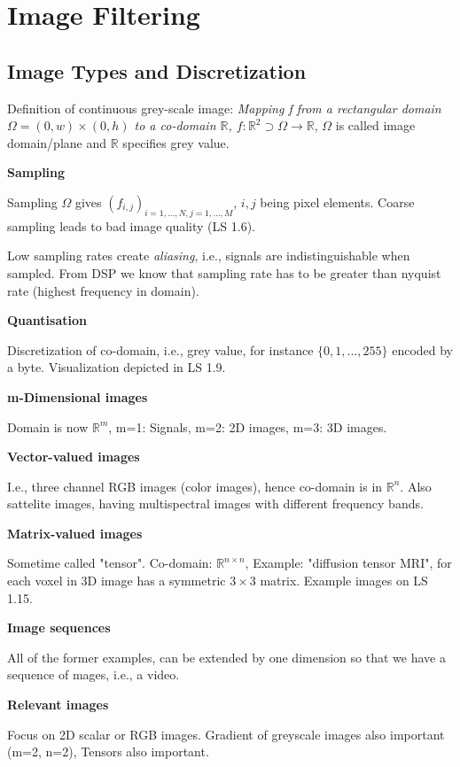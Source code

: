 \chapter{Image Filtering}

\section{Image Types and Discretization}

Definition of continuous grey-scale image: \emph{Mapping f from a rectangular domain $\Omega = (0,w) \times (0,h)$ to a co-domain $\mathbb{R}$, $f : \mathbb{R}^2 \supset \Omega \rightarrow \mathbb{R}$}, $\Omega$ is called image domain/plane and $\mathbb{R}$ specifies grey value.

\textbf{Sampling}

Sampling $\Omega$ gives $(f_{i,j})_{i=1,\dots ,N, j=1, \dots , M}$, $i,j$ being pixel elements. Coarse sampling leads to bad image quality (LS 1.6).

Low sampling rates create \textit{aliasing}, i.e., signals are indistinguishable when sampled. From DSP we know that sampling rate has to be greater than nyquist rate (highest frequency in domain).

\textbf{Quantisation}

Discretization of co-domain, i.e., grey value, for instance $\{0,1,...,255\}$ encoded by a byte. Visualization depicted in LS 1.9.

\textbf{m-Dimensional images}

Domain is now $\mathbb{R}^m$, m=1: Signals, m=2: 2D images, m=3: 3D images.

\textbf{Vector-valued images}

I.e., three channel RGB images (color images), hence co-domain is in $\mathbb{R}^n$. Also sattelite images, having multispectral images with different frequency bands.

\textbf{Matrix-valued images}

Sometime called "tensor". Co-domain: $\mathbb{R}^{n\times n}$, Example: "diffusion tensor MRI", for each voxel in 3D image has a symmetric $3\times 3$ matrix. Example images on LS 1.15.

\textbf{Image sequences}

All of the former examples, can be extended by one dimension so that we have a sequence of mages, i.e., a video.

\textbf{Relevant images}

Focus on 2D scalar or RGB images. Gradient of greyscale images also important (m=2, n=2), Tensors also important.

